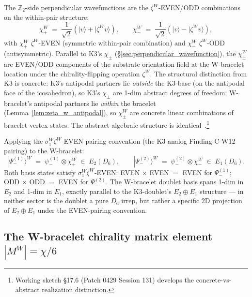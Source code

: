 \documentclass[11pt,letterpaper]{article}
\newcommand{\PsiminusOne}{|\Psi_-^{(1)}\rangle}
\newcommand{\PsiminusTwo}{|\Psi_-^{(2)}\rangle}
\newcommand{\Dsix}{D_6}
\begin{document}
The $\mathbb{Z}_2$-side perpendicular wavefunctions are the $\zeta^W$-EVEN/ODD combinations on the within-pair structure:
\begin{equation}\label{eq:w_perpendicular_basis}
\chi_+^W \;=\; \frac{1}{\sqrt{2}}(|v\rangle + |\zeta^W v\rangle), \qquad \chi_-^W \;=\; \frac{1}{\sqrt{2}}(|v\rangle - |\zeta^W v\rangle),
\end{equation}
with $\chi_+^W$ $\zeta^W$-EVEN (symmetric within-pair combination) and $\chi_-^W$ $\zeta^W$-ODD (antisymmetric). Parallel to K3's $\chi_\pm$ (\S\ref{sec:perpendicular_wavefunction}), the $\chi_\pm^W$ are EVEN/ODD components of the substrate orientation field at the W-bracelet location under the chirality-flipping operation $\zeta^W$. The structural distinction from K3 is concrete: K3's antipodal partners lie \emph{outside} the K3-base (on the antipodal face of the icosahedron), so K3's $\chi_\pm$ are 1-dim abstract degrees of freedom; W-bracelet's antipodal partners lie \emph{within} the bracelet (Lemma~\ref{lem:zeta_w_antipodal}), so $\chi_\pm^W$ are concrete linear combinations of bracelet vertex states. The abstract algebraic structure is identical~\cite{abshier_capotauro_chiral_mechanism_sketch}.\footnote{Working sketch \S17.6 (Patch 0429 Session 131) develops the concrete-vs-abstract realization distinction.}

Applying the $\sigma_1^W \zeta^W$-EVEN pairing convention (the K3-analog Finding C-W12 pairing) to the W-bracelet:
\begin{equation}\label{eq:w_doublet_basis}
\PsiminusOne^W \;=\; \psi_-^{(1)} \otimes \chi_+^W \;\in\; E_2(\Dsix), \qquad
\PsiminusTwo^W \;=\; \psi_-^{(2)} \otimes \chi_-^W \;\in\; E_1(\Dsix).
\end{equation}
Both basis states satisfy $\sigma_1^W \zeta^W$-EVEN: EVEN $\times$ EVEN $=$ EVEN for $\Psi_-^{(1)}$; ODD $\times$ ODD $=$ EVEN for $\Psi_-^{(2)}$. The W-bracelet doublet basis spans 1-dim in $E_2$ and 1-dim in $E_1$, exactly parallel to the K3-doublet's $E_2 \oplus E_1$ structure --- in neither sector is the doublet a pure $\Dsix$ irrep, but rather a specific 2D projection of $E_2 \oplus E_1$ under the EVEN-pairing convention.

\subsection{The W-bracelet chirality matrix element $|M^W| = \chi/6$}\label{sec:w_matrix_element}
\end{document}
